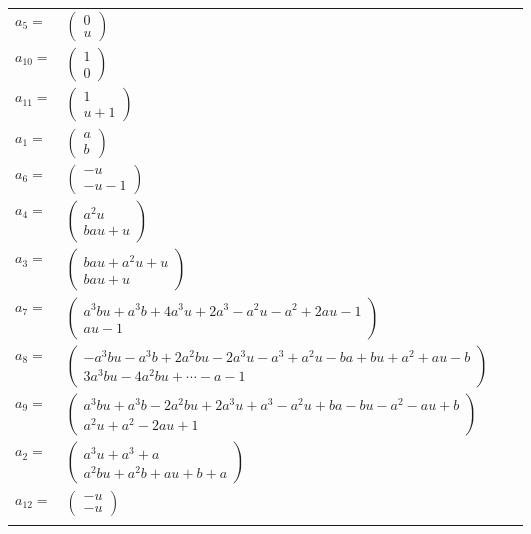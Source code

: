 \documentclass[1p]{elsarticle_modified}
\theoremstyle{definition}
\begin{document}
\begin{tabular}{m{7pt} m{180pt} m{7pt} m{180pt} }
\flushright $a_{5}=$&$\begin{pmatrix}0\\u\end{pmatrix}$ \\
\flushright $a_{10}=$&$\begin{pmatrix}1\\0\end{pmatrix}$ \\
\flushright $a_{11}=$&$\begin{pmatrix}1\\u+1\end{pmatrix}$ \\
\flushright $a_{1}=$&$\begin{pmatrix}a\\b\end{pmatrix}$ \\
\flushright $a_{6}=$&$\begin{pmatrix}- u\\- u-1\end{pmatrix}$ \\
\flushright $a_{4}=$&$\begin{pmatrix}a^2 u\\b a u+u\end{pmatrix}$ \\
\flushright $a_{3}=$&$\begin{pmatrix}b a u+a^2 u+u\\b a u+u\end{pmatrix}$ \\
\flushright $a_{7}=$&$\begin{pmatrix}a^3 b u+a^3 b+4 a^3 u+2 a^3- a^2 u- a^2+2 a u-1\\a u-1\end{pmatrix}$ \\
\flushright $a_{8}=$&$\begin{pmatrix}- a^3 b u- a^3 b+2 a^2 b u-2 a^3 u- a^3+a^2 u- b a+b u+a^2+a u- b\\3 a^3 b u-4 a^2 b u+\cdots- a-1\end{pmatrix}$ \\
\flushright $a_{9}=$&$\begin{pmatrix}a^3 b u+a^3 b-2 a^2 b u+2 a^3 u+a^3- a^2 u+b a- b u- a^2- a u+b\\a^2 u+a^2-2 a u+1\end{pmatrix}$ \\
\flushright $a_{2}=$&$\begin{pmatrix}a^3 u+a^3+a\\a^2 b u+a^2 b+a u+b+a\end{pmatrix}$ \\
\flushright $a_{12}=$&$\begin{pmatrix}- u\\- u\end{pmatrix}$\\&\end{tabular}
\end{document}

